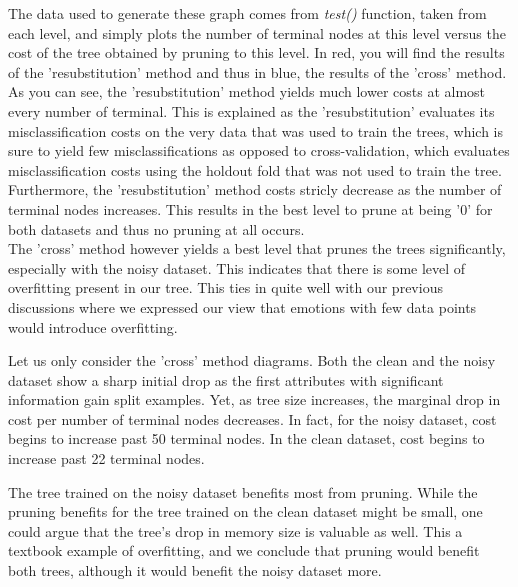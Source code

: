 The data used to generate these graph comes from \emph{test()} function,
taken from each level, and simply plots the number of terminal nodes at this level versus
the cost of the tree obtained by pruning to this level.
In red, you will find the results of the 'resubstitution' method and thus in blue, the results of the 'cross' method.
As you can see, the 'resubstitution' method yields much lower costs at almost every number of terminal.
This is explained as the 'resubstitution' evaluates its misclassification costs on the very data that was used to train
the trees, which is sure to yield few misclassifications as opposed to cross-validation, which evaluates misclassification costs
using the holdout fold that was not used to train the tree.
Furthermore, the 'resubstitution' method costs stricly decrease as the number of terminal nodes increases.
This results in the best level to prune at being '0' for both datasets and thus no pruning at all occurs.\\
The 'cross' method however yields a best level that prunes the trees significantly, especially with the noisy dataset.
This indicates that there is some level of overfitting present in our tree. This ties in quite well with our previous discussions
where we expressed our view that emotions with few data points would introduce overfitting.

Let us only consider the 'cross' method diagrams.
Both the clean and the noisy dataset show a sharp initial drop
as the first attributes with significant information gain split
examples. Yet, as tree size increases, the marginal drop in cost per
number of terminal nodes decreases. In fact, for
the noisy dataset, cost begins to increase past 50 terminal nodes.
In the clean dataset, cost begins to increase past 22 terminal nodes.

The tree trained on the noisy dataset benefits most from pruning.
While the pruning benefits for the tree trained on the clean dataset
might be small, one could argue that the tree's drop in memory size
is valuable as well.
This a textbook example of overfitting, and we conclude that pruning
would benefit both trees, although it would benefit the noisy dataset more.
